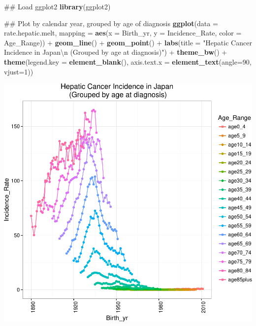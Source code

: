\documentclass[11pt,]{article}
\newenvironment{Shaded}{\begin{snugshade}}{\end{snugshade}}
\newcommand{\KeywordTok}[1]{\textcolor[rgb]{0.13,0.29,0.53}{\textbf{{#1}}}}
\newcommand{\DataTypeTok}[1]{\textcolor[rgb]{0.13,0.29,0.53}{{#1}}}
\newcommand{\DecValTok}[1]{\textcolor[rgb]{0.00,0.00,0.81}{{#1}}}
\newcommand{\CharTok}[1]{\textcolor[rgb]{0.31,0.60,0.02}{{#1}}}
\newcommand{\StringTok}[1]{\textcolor[rgb]{0.31,0.60,0.02}{{#1}}}
\newcommand{\NormalTok}[1]{{#1}}
\begin{document}
\begin{Shaded}
\begin{Highlighting}[]
\NormalTok{## Load ggplot2}
\KeywordTok{library}\NormalTok{(ggplot2)}

\NormalTok{## Plot by calendar year, grouped by age of diagnosis}
\KeywordTok{ggplot}\NormalTok{(}\DataTypeTok{data =} \NormalTok{rate.hepatic.melt,}
       \DataTypeTok{mapping =} \KeywordTok{aes}\NormalTok{(}\DataTypeTok{x =} \NormalTok{Birth_yr, }\DataTypeTok{y =} \NormalTok{Incidence_Rate,}
                     \DataTypeTok{color =} \NormalTok{Age_Range)) +}\StringTok{ }
\StringTok{  }\KeywordTok{geom_line}\NormalTok{() +}
\StringTok{  }\KeywordTok{geom_point}\NormalTok{() +}
\StringTok{    }\KeywordTok{labs}\NormalTok{(}\DataTypeTok{title =} 
           \StringTok{"Hepatic Cancer Incidence in Japan}\CharTok{\textbackslash{}n}\StringTok{ (Grouped by age at diagnosis)"}\NormalTok{) +}\StringTok{ }
\StringTok{    }\KeywordTok{theme_bw}\NormalTok{() +}
\StringTok{    }\KeywordTok{theme}\NormalTok{(}\DataTypeTok{legend.key =} \KeywordTok{element_blank}\NormalTok{(),}
          \DataTypeTok{axis.text.x =} \KeywordTok{element_text}\NormalTok{(}\DataTypeTok{angle=}\DecValTok{90}\NormalTok{, }\DataTypeTok{vjust=}\DecValTok{1}\NormalTok{))}
\end{Highlighting}
\end{Shaded}

\includegraphics{example_files/figure-latex/unnamed-chunk-2-1.pdf}

\hypertarget{refs}{}
\end{document}
